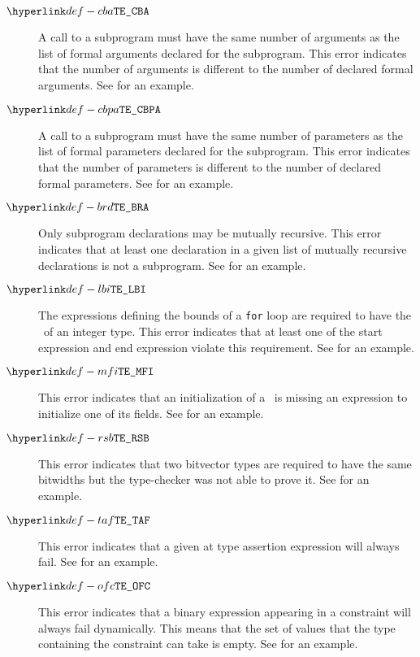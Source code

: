 \begin{description}
\hypertarget{def-cba}{}
\item[$\CallBadArity$]
A call to a subprogram must have the same number of arguments as the list of formal arguments
declared for the subprogram.
This error indicates that the number of arguments is different to the number of declared formal arguments.
See  for an example.

\hypertarget{def-cbpa}{}
\item[$\CallBadParameterArity$]
A call to a subprogram must have the same number of parameters as the list of formal parameters
declared for the subprogram.
This error indicates that the number of parameters is different to the number of declared formal parameters.
See  for an example.

\hypertarget{def-brd}{}
\item[$\BadRecursiveDecls$]
Only subprogram declarations may be mutually recursive.
This error indicates that at least one declaration in a given list of mutually recursive declarations
is not a subprogram.
See  for an example.

\hypertarget{def-lbi}{}
\item[$\RequireIntegerForLoopBounds$]
The expressions defining the bounds of a \texttt{for} loop are required to have the \structure\ of
an integer type.
This error indicates that at least one of the start expression and end expression violate this
requirement.
See  for an example.

\hypertarget{def-mfi}{}
\item[$\MissingFieldInitializer$]
This error indicates that an initialization of a \structuredtype\ is missing an expression to initialize
one of its fields.
See  for an example.

\hypertarget{def-rsb}{}
\item[$\RequireSameBitwidths$]
This error indicates that two bitvector types are required to have the same bitwidths but the type-checker
was not able to prove it.
See  for an example.

\hypertarget{def-taf}{}
\item[$\TypeAsssertionFails$]
This error indicates that a given at type assertion expression will always fail.
See  for an example.

\hypertarget{def-ofc}{}
\item[$\BinaryOperationFailsAllConstraints$]
This error indicates that a binary expression appearing in a constraint will always fail dynamically.
This means that the set of values that the type containing
the constraint can take is empty.
See  for an example.


\end{description}
